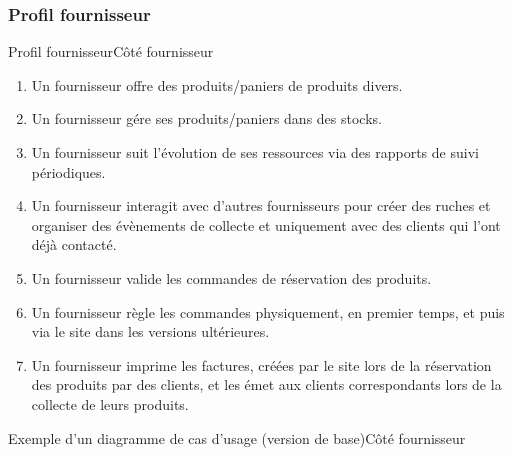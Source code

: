 \documentclass[usenames,dvipsnames]{beamer}
\begin{document}
\subsubsection*{Profil fournisseur}
\begin{frame}{Profil fournisseur}{Côté fournisseur}
\begin{enumerate}
  \item Un fournisseur offre des produits/paniers de produits divers.
  \item Un fournisseur gére ses produits/paniers dans des stocks.
  \item Un fournisseur suit l'évolution de ses ressources via des rapports de suivi périodiques.
  \item Un fournisseur interagit avec d'autres fournisseurs pour créer des ruches et organiser des évènements de collecte et uniquement avec des clients qui l'ont déjà contacté.
  \item Un fournisseur valide les commandes de réservation des produits.
  \item Un fournisseur règle les commandes physiquement, en premier temps, et puis via le site dans les versions ultérieures.
  \item Un fournisseur imprime les factures, créées par le site lors de la réservation des produits par des clients, et les émet aux clients correspondants lors de la collecte de leurs produits.
\end{enumerate}
\end{frame}

\begin{frame}{Exemple d'un diagramme de cas d'usage (version de base)}{Côté fournisseur}
\begin{figure}[!ht]
  \centering
\end{figure}
\end{frame}
\end{document}
